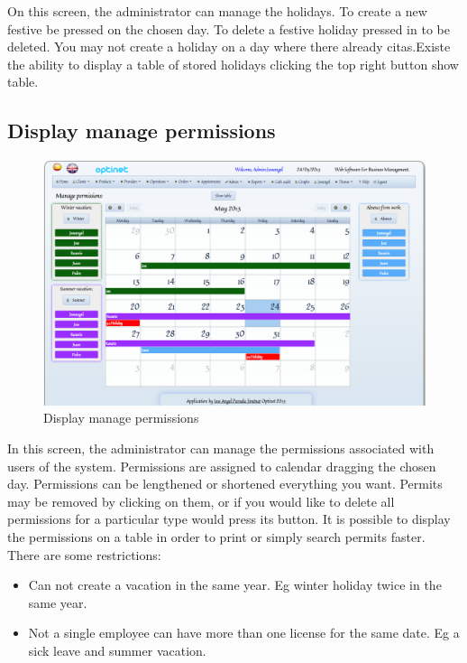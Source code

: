 \documentclass[a4paper,11pt]{book}
\begin{document}
On this screen, the administrator can manage the holidays. To create a new festive be pressed on the chosen day. To delete a festive holiday pressed in to be deleted. You may not create a holiday on a day where there already citas.Existe the ability to display a table of stored holidays clicking the top right button show table.

\newpage
\subsection {Display manage permissions}

\begin{figure}[!htb]
  \centering
    \includegraphics[scale=0.35]{icappermisos.png}
  \caption{Display manage permissions}
  \label{a}
\end{figure}

In this screen, the administrator can manage the permissions associated with users of the system. Permissions are assigned to calendar dragging the chosen day. Permissions can be lengthened or shortened everything you want. Permits may be removed by clicking on them, or if you would like to delete all permissions for a particular type would press its button. It is possible to display the permissions on a table in order to print or simply search permits faster. There are some restrictions:
\begin{itemize}
\item Can not create a vacation in the same year. Eg winter holiday twice in the same year.
\item Not a single employee can have more than one license for the same date. Eg a sick leave and summer vacation.
\end{itemize}
\end{document}
